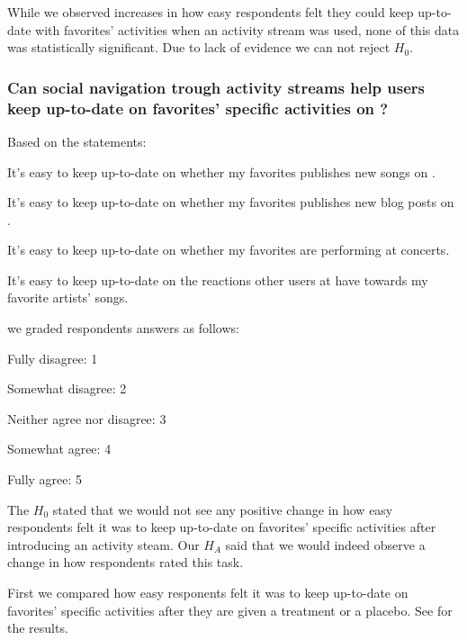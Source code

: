 \parabreak

While we observed increases in how easy respondents felt they could keep
up-to-date with favorites' activities when an activity stream was used,
none of this data was statistically significant. Due to lack of evidence we
can not reject $H_0$.

\subsubsection{%
  Can social navigation trough activity streams help users keep
  up-to-date on favorites' specific activities on \urort{}?
}

Based on the statements:
\begin{items}
  \item It's easy to keep up-to-date on whether my favorites publishes
    new songs on \urort{}.
  \item It's easy to keep up-to-date on whether my favorites publishes
    new blog posts on \urort{}.
  \item It's easy to keep up-to-date on whether my favorites are
    performing at concerts.
  \item It's easy to keep up-to-date on the reactions other users at
    \urort{} have towards my favorite artists' songs.
\end{items}

we graded respondents answers as follows:

\begin{items}
  \item Fully disagree: 1
  \item Somewhat disagree: 2
  \item Neither agree nor disagree: 3
  \item Somewhat agree: 4
  \item Fully agree: 5
\end{items}

The $H_0$ stated that we would not see any positive change in how easy
respondents felt it was to keep up-to-date on favorites' specific activities
after introducing an activity steam. Our $H_A$ said that we
would indeed observe a change in how respondents rated this task.

First we compared how easy responents felt it was to keep up-to-date on
favorites' specific activities after they are given a treatment
or a placebo.
See
 for the results.

